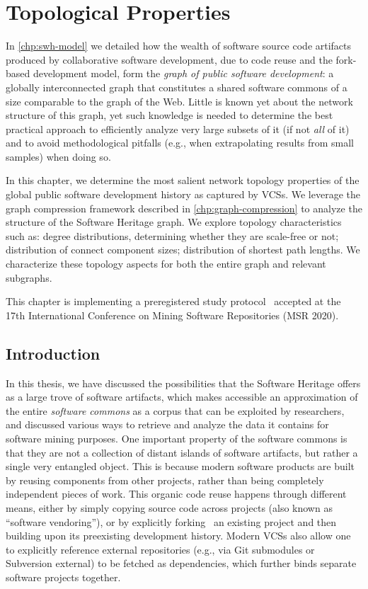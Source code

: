 \chapter{Topological Properties}%
\label{chp:topology}

In \cref{chp:swh-model} we detailed how the wealth of software source
code artifacts produced by collaborative software development, due to code
reuse and the fork-based development model, form the \emph{graph of public
software development}: a globally interconnected graph that constitutes a
shared software commons of a size comparable to the graph of the Web.
Little is known yet about the network structure of this graph, yet such
knowledge is needed to determine the best practical approach to efficiently
analyze very large subsets of it (if not \emph{all} of it) and to avoid
methodological pitfalls (e.g., when extrapolating results from small samples)
when doing so.

In this chapter, we determine the most salient network topology properties of
the global public software development history as captured by \glspl{VCS}. We
leverage the graph compression framework described in
\cref{chp:graph-compression} to analyze the structure of the Software Heritage
graph.
We explore topology characteristics such as: degree distributions,
determining whether they are scale-free or not; distribution of connect
component sizes; distribution of shortest path lengths. We characterize these
topology aspects for both the entire graph and relevant subgraphs.

This chapter is implementing a preregistered study
protocol~\cite{msr-2020-topology} accepted at the 17th International Conference
on Mining Software Repositories (MSR 2020).

\section{Introduction}

In this thesis, we have discussed the possibilities that the Software Heritage
offers as a large trove of software artifacts, which makes accessible an
approximation of the entire \emph{software commons} as a corpus that can be
exploited by researchers, and discussed various ways to retrieve and analyze
the data it contains for software mining purposes.
One important property of the software commons is that they are not a
collection of distant islands of software artifacts, but rather a single very
entangled object. This is because modern software products are built by reusing
components from other projects, rather than being completely independent pieces
of work. This organic code reuse happens through different means, either by
simply copying source code across projects (also known as ``software
vendoring''), or by explicitly forking~\cite{robles2012forks,
swh-msr2020-forking} an existing project and then building upon its preexisting
development history. Modern \glspl{VCS} also allow one to explicitly reference
external repositories (e.g., via Git submodules or Subversion external) to be
fetched as dependencies, which further binds separate software projects
together.


